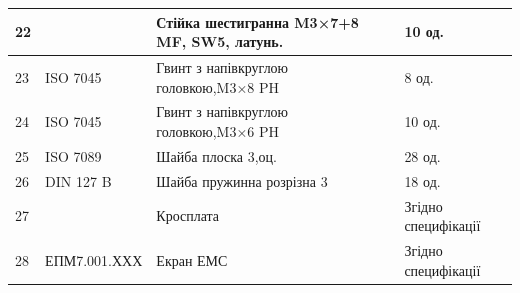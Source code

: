 \begin{table}[H]
\begin{tabular}{|p{0.8cm}|p{3.2cm}|p{7.5cm}|p{2cm}|}
       22 &  & Стійка шестигранна M3×7+8 MF, SW5, латунь. & 10 од. \\ \hline
       23 & ISO 7045 & Гвинт з напівкруглою головкою,M3×8 PH & 8 од. \\ \hline
       24 & ISO 7045 & Гвинт з напівкруглою головкою,M3×6 PH & 10 од. \\ \hline
       25 & ISO 7089 & Шайба плоска 3,оц. & 28 од. \\ \hline
       26 & DIN 127 B & Шайба пружинна розрізна 3 & 18 од. \\ \hline
       27 &  & Кросплата & Згідно специфікації \\ \hline
       28 & ЕПМ7.001.ХХХ & Екран ЕМС & Згідно специфікації \\ \hline
   
    \end{tabular}
    
\end{table}

